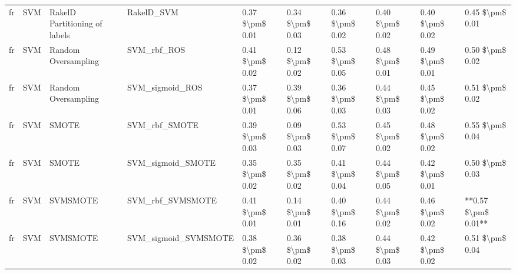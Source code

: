 \begin{tabular}{llllllllll}
      fr &                             SVM & RakelD Partitioning of labels &                                   RakelD\_SVM & 0.37 \$\textbackslash pm\$ 0.01 &           0.34 \$\textbackslash pm\$ 0.03 &       0.36 \$\textbackslash pm\$ 0.02 &        0.40 \$\textbackslash pm\$ 0.02 &                         0.40 \$\textbackslash pm\$ 0.02 &     0.45 \$\textbackslash pm\$ 0.01 \\
      fr &                             SVM &           Random Oversampling &                                  SVM\_rbf\_ROS & 0.41 \$\textbackslash pm\$ 0.02 &           0.12 \$\textbackslash pm\$ 0.02 &       0.53 \$\textbackslash pm\$ 0.05 &        0.48 \$\textbackslash pm\$ 0.01 &                         0.49 \$\textbackslash pm\$ 0.01 &     0.50 \$\textbackslash pm\$ 0.02 \\
      fr &                             SVM &           Random Oversampling &                              SVM\_sigmoid\_ROS & 0.37 \$\textbackslash pm\$ 0.01 &           0.39 \$\textbackslash pm\$ 0.06 &       0.36 \$\textbackslash pm\$ 0.03 &        0.44 \$\textbackslash pm\$ 0.03 &                         0.45 \$\textbackslash pm\$ 0.02 &     0.51 \$\textbackslash pm\$ 0.02 \\
      fr &                             SVM &                         SMOTE &                                SVM\_rbf\_SMOTE & 0.39 \$\textbackslash pm\$ 0.03 &           0.09 \$\textbackslash pm\$ 0.03 &       0.53 \$\textbackslash pm\$ 0.07 &        0.45 \$\textbackslash pm\$ 0.02 &                         0.48 \$\textbackslash pm\$ 0.02 &     0.55 \$\textbackslash pm\$ 0.04 \\
      fr &                             SVM &                         SMOTE &                            SVM\_sigmoid\_SMOTE & 0.35 \$\textbackslash pm\$ 0.02 &           0.35 \$\textbackslash pm\$ 0.02 &       0.41 \$\textbackslash pm\$ 0.04 &        0.44 \$\textbackslash pm\$ 0.05 &                         0.42 \$\textbackslash pm\$ 0.01 &     0.50 \$\textbackslash pm\$ 0.03 \\
      fr &                             SVM &                      SVMSMOTE &                             SVM\_rbf\_SVMSMOTE & 0.41 \$\textbackslash pm\$ 0.01 &           0.14 \$\textbackslash pm\$ 0.01 &       0.40 \$\textbackslash pm\$ 0.16 &        0.44 \$\textbackslash pm\$ 0.02 &                         0.46 \$\textbackslash pm\$ 0.02 & **0.57 \$\textbackslash pm\$ 0.01** \\
      fr &                             SVM &                      SVMSMOTE &                         SVM\_sigmoid\_SVMSMOTE & 0.38 \$\textbackslash pm\$ 0.02 &           0.36 \$\textbackslash pm\$ 0.02 &       0.38 \$\textbackslash pm\$ 0.03 &        0.44 \$\textbackslash pm\$ 0.03 &                         0.42 \$\textbackslash pm\$ 0.02 &     0.51 \$\textbackslash pm\$ 0.04 \\

\end{tabular}
